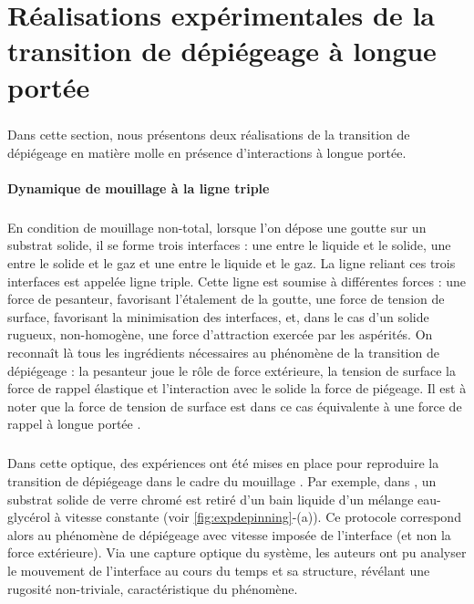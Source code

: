 \section{Réalisations expérimentales de la transition de dépiégeage à longue portée}

\label{app:exp_depinning}

\subparagraph{}Dans cette section, nous présentons deux réalisations de la transition de dépiégeage en matière molle en présence d'interactions à longue portée.

\paragraph{Dynamique de mouillage à la ligne triple}

\subparagraph{}En condition de mouillage non-total, lorsque l'on dépose une goutte sur un substrat solide, il se forme trois interfaces : une entre le liquide et le solide, une entre le solide et le gaz et une entre le liquide et le gaz. La ligne reliant ces trois interfaces est appelée ligne triple. Cette ligne est soumise à différentes forces : une force de pesanteur, favorisant l'étalement de la goutte, une force de tension de surface, favorisant la minimisation des interfaces, et, dans le cas d'un solide rugueux, non-homogène, une force d'attraction exercée par les aspérités. On reconnaît là tous les ingrédients nécessaires au phénomène de la transition de dépiégeage \cite{joanny_model_1984, rosso_depiegeage_2002, le_priol_long_range_2020} : la pesanteur joue le rôle de force extérieure, la tension de surface la force de rappel élastique et l'interaction avec le solide la force de piégeage. Il est à noter que la force de tension de surface est dans ce cas équivalente à une force de rappel à longue portée \cite{joanny_model_1984}.

\subparagraph{}Dans cette optique, des expériences ont été mises en place pour reproduire la transition de dépiégeage dans le cadre du mouillage \cite{moulinet_roughness_2002, le_doussal_height_2009}. Par exemple, dans \cite{moulinet_roughness_2002}, un substrat solide de verre chromé est retiré d'un bain liquide d'un mélange eau-glycérol à vitesse constante (voir \autoref{fig:expdepinning}-(a)). Ce protocole correspond alors au phénomène de dépiégeage avec vitesse imposée de l'interface (et non la force extérieure). Via une capture optique du système, les auteurs ont pu analyser le mouvement de l'interface au cours du temps et sa structure, révélant une rugosité non-triviale, caractéristique du phénomène.


